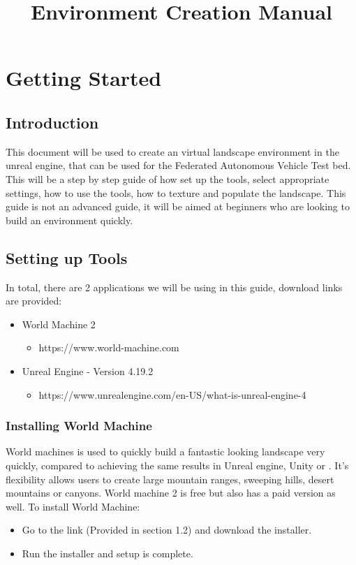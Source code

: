 \documentclass[../main.tex]{subfiles}
\title{Environment Creation Manual}
\begin{document}
\section{Getting Started}
\subsection{Introduction}
This document will be used to create an virtual landscape environment in the unreal engine, that can be used for the Federated Autonomous Vehicle Test bed.
This will be a step by step guide of how set up the tools, select appropriate settings, how to use the tools, how to texture and  populate the landscape.
This guide is not an advanced guide, it will be aimed at beginners who are looking to build an environment quickly.

\subsection{Setting up Tools}
In total, there are 2 applications we will be using in this guide, download links are provided:
\begin{itemize}
    \item World Machine 2
    \begin{itemize}
        \item https://www.world-machine.com
    \end{itemize}

    \item Unreal Engine - Version 4.19.2
    \begin{itemize}
        \item https://www.unrealengine.com/en-US/what-is-unreal-engine-4
    \end{itemize}

\end{itemize}

\subsubsection{Installing World Machine}
World machines is used to quickly build a fantastic looking landscape very quickly, compared to achieving the same results in Unreal engine, Unity or . It’s flexibility allows users to create large mountain ranges, sweeping hills, desert mountains or canyons. World machine 2 is free but also has a paid version as well.
To install World Machine:
\begin{itemize}
        \item Go to the link (Provided in section 1.2) and download the installer.
        \item  Run the installer and setup is complete.
\end{itemize}
\end{document}
